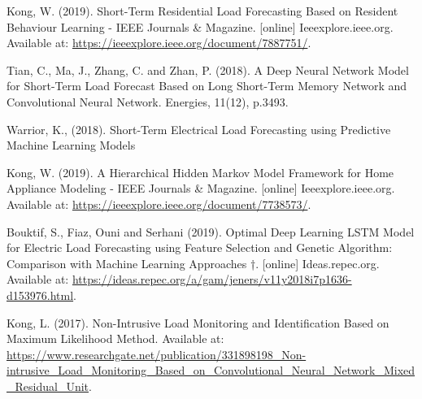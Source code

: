 \documentclass[12pt,twocolumn]{article}
\begin{document}
	\begin{thebibliography}{99}
		 Kong, W. (2019). Short-Term Residential Load Forecasting Based on Resident Behaviour Learning - IEEE Journals \& Magazine. [online] Ieeexplore.ieee.org. Available at: \url{https://ieeexplore.ieee.org/document/7887751/}.

		 Tian, C., Ma, J., Zhang, C. and Zhan, P. (2018). A Deep Neural Network Model for Short-Term Load Forecast Based on Long Short-Term Memory Network and Convolutional Neural Network. Energies, 11(12), p.3493.

		 Warrior, K., (2018). Short-Term Electrical Load Forecasting using Predictive Machine Learning Models

		 Kong, W. (2019). A Hierarchical Hidden Markov Model Framework for Home Appliance Modeling - IEEE Journals \& Magazine. [online] Ieeexplore.ieee.org. Available at: \url{https://ieeexplore.ieee.org/document/7738573/}.

		 Bouktif, S., Fiaz, Ouni and Serhani (2019). Optimal Deep Learning LSTM Model for Electric Load Forecasting using Feature Selection and Genetic Algorithm: Comparison with Machine Learning Approaches †. [online] Ideas.repec.org. Available at: \url{https://ideas.repec.org/a/gam/jeners/v11y2018i7p1636-d153976.html}.

		 Kong, L. (2017). Non-Intrusive Load Monitoring and Identification Based on Maximum Likelihood Method. Available at: \url{https://www.researchgate.net/publication/331898198_Non-intrusive_Load_Monitoring_Based_on_Convolutional_Neural_Network_Mixed_Residual_Unit}.



	
	\end{thebibliography}
\end{document}

